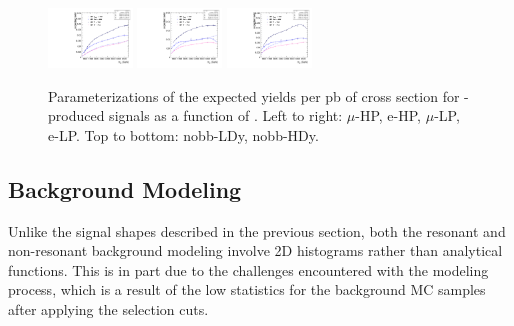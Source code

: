 \begin{figure}[htbp]
  \includegraphics[width=0.2\textwidth]{fig/2Dfit/paramSignalYield_VBFSig_e_HP_nobb_HDy.pdf}
  \includegraphics[width=0.2\textwidth]{fig/2Dfit/paramSignalYield_VBFSig_mu_LP_nobb_HDy.pdf}
  \includegraphics[width=0.2\textwidth]{fig/2Dfit/paramSignalYield_VBFSig_e_LP_nobb_HDy.pdf}\\
  \caption{
    Parameterizations of the expected yields per pb of cross section for \VBF-produced signals as a function of \MX.
    Left to right: $\mu$-HP, e-HP, $\mu$-LP, e-LP.
    Top to bottom: nobb-LDy, nobb-HDy.
  }
  \label{fig:YieldParam_VBF_Run2}
\end{figure}

\clearpage

\subsection{Background Modeling}
\label{sec:bkg}

Unlike the signal shapes described in the previous section, both the resonant and non-resonant background modeling involve 2D histograms rather than analytical functions.
This is in part due to the challenges encountered with the modeling process, which is a result of the low statistics for the background MC samples after applying the selection cuts.

